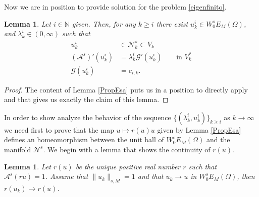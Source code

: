 \documentclass{amsart}
\newcommand{\N}{{\mathbb N}}
\newcommand{\EE}{{\mathcal A}^s}
\newtheorem{lema}[teo]{Lemma}
\theoremstyle{remark}
\theoremstyle{definition}
\numberwithin{equation}{section}
\begin{document}
Now we are in position to provide solution for the problem \eqref{eigenfinito}.
\begin{lema}\label{soleigenfinito}
Let $i\in \N$ given. Then, for any $k\ge i$  there exist $u_k^i\in W_0^s E_M(\Omega)$, and $\lambda_k^i\in  (0,\infty)$ such that 
\begin{align*}
u_k^i&\in \mathcal{N}_k^s\subset V_k
\\
(\EE)'(u_k^i)&=\lambda_k^i \mathcal{G}'(u_k^i)\qquad \text{in }V_k^{*}
\\
\mathcal{G}(u_k^i)&=c_{i,k}.
\end{align*}
\end{lema}

\begin{proof}
The content of Lemma \ref{PropEsa} puts us in a position to directly apply \cite[Theorem 2 and Corollary 7.1]{Zei80} and that gives us exactly the claim of this lemma.
\end{proof}

In order to show analyze the behavior of the sequence $\{(\lambda_k^i, u_k^i)\}_{k\ge i}$ as $k\to\infty$ we need first to prove that the map $u\mapsto r(u)u$ given by Lemma \ref{PropEsa} defines an homeomorphism between the unit ball of $W^s_0E_M(\Omega)$ and the manifold $\mathcal{N}^s$. We begin with a lemma that shows the continuity of $r(u)$.
\begin{lema}\label{r.cont}
Let $r(u)$ be the unique positive real number $r$ such that $\EE(ru)=1$. Assume that $\|u_k\|_{s, M} = 1$ and that $u_k\to u$ in $W^s_0E_M(\Omega)$, then $r(u_k)\to r(u)$.
\end{lema}
\end{document}
